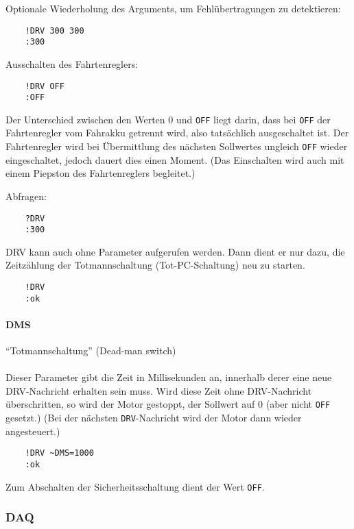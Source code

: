 \textcolor[rgb]{0.75,0.75,0.75}{Optionale Wiederholung des Arguments, um Fehlübertragungen zu detektieren:}
\begin{verbatim}
	!DRV 300 300
	:300
\end{verbatim}


Ausschalten des Fahrtenreglers:
\begin{verbatim}
	!DRV OFF
	:OFF
\end{verbatim}
Der Unterschied zwischen den Werten 0 und \verb|OFF| liegt darin, dass bei \verb|OFF| der Fahrtenregler vom Fahrakku getrennt wird, also tatsächlich ausgeschaltet ist. Der Fahrtenregler wird bei Übermittlung des nächsten Sollwertes ungleich \verb|OFF| wieder eingeschaltet, jedoch dauert dies einen Moment. (Das Einschalten wird auch mit einem Piepston des Fahrtenreglers begleitet.)


Abfragen:
\begin{verbatim}
	?DRV
	:300
\end{verbatim}


\textcolor[rgb]{0.75,0.75,0.75}{DRV kann auch ohne Parameter aufgerufen werden. Dann dient er nur dazu, die Zeitzählung der Totmannschaltung (\bzw Tot-PC-Schaltung) neu zu starten.
}
\begin{verbatim}
	!DRV
	:ok
\end{verbatim}




\paragraph{DMS}

\textcolor[rgb]{0.75,0.75,0.75}{
"`Totmannschaltung"' (Dead-man switch)\\
\\
Dieser Parameter gibt die Zeit in Millisekunden an, innerhalb derer eine neue DRV-Nachricht erhalten sein muss. Wird diese Zeit ohne DRV-Nachricht überschritten, so wird der Motor gestoppt, \dah der Sollwert auf 0 (aber nicht \texttt{OFF} gesetzt.) (Bei der nächsten \texttt{DRV}-Nachricht wird der Motor dann wieder angesteuert.)
}
\begin{verbatim}
	!DRV ~DMS=1000
	:ok
\end{verbatim}
\textcolor[rgb]{0.75,0.75,0.75}{
Zum Abschalten der Sicherheitsschaltung dient der Wert \texttt{OFF}.}



\subsubsection{DAQ}

